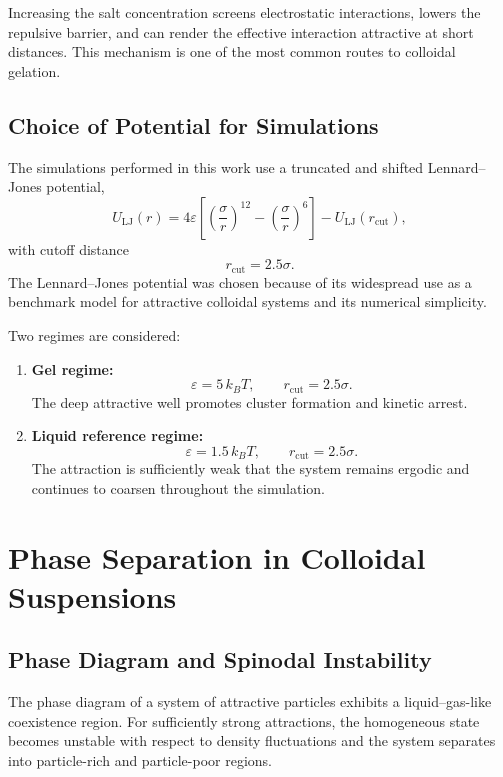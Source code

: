 \documentclass[11pt,a4paper]{article}
\begin{document}
Increasing the salt concentration screens electrostatic interactions, lowers the repulsive barrier, and can render the effective interaction attractive at short distances. This mechanism is one of the most common routes to colloidal gelation.

\subsection{Choice of Potential for Simulations}

The simulations performed in this work use a truncated and shifted Lennard--Jones potential,
\begin{equation}
    U_{\mathrm{LJ}}(r)
    =
    4\varepsilon
    \left[
    \left(\frac{\sigma}{r}\right)^{12}
    -
    \left(\frac{\sigma}{r}\right)^6
    \right]
    - U_{\mathrm{LJ}}(r_{\mathrm{cut}}),
    \label{eq:lj}
\end{equation}
with cutoff distance
\begin{equation}
    r_{\mathrm{cut}} = 2.5\sigma.
\end{equation}
The Lennard--Jones potential was chosen because of its widespread use as a benchmark model for attractive colloidal systems and its numerical simplicity.

Two regimes are considered:
\begin{enumerate}
    \item \textbf{Gel regime:}
    \[
    \varepsilon = 5\,k_B T,
    \qquad
    r_{\mathrm{cut}} = 2.5\sigma.
    \]
    The deep attractive well promotes cluster formation and kinetic arrest.

    \item \textbf{Liquid reference regime:}
    \[
    \varepsilon = 1.5\,k_B T,
    \qquad
    r_{\mathrm{cut}} = 2.5\sigma.
    \]
    The attraction is sufficiently weak that the system remains ergodic and continues to coarsen throughout the simulation.
\end{enumerate}

\section{Phase Separation in Colloidal Suspensions}

\subsection{Phase Diagram and Spinodal Instability}

The phase diagram of a system of attractive particles exhibits a liquid--gas-like coexistence region. For sufficiently strong attractions, the homogeneous state becomes unstable with respect to density fluctuations and the system separates into particle-rich and particle-poor regions.
\end{document}
